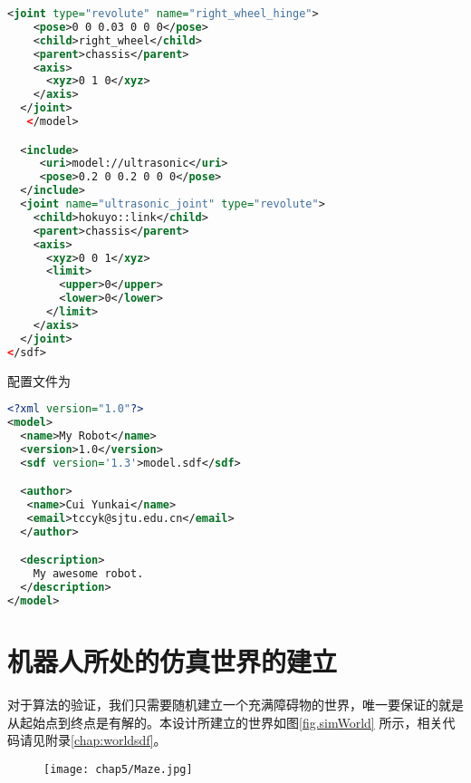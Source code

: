\begin{lstlisting}[language={XML}, caption={机器人模型描述文件}]
  <joint type="revolute" name="right_wheel_hinge">
    <pose>0 0 0.03 0 0 0</pose>
    <child>right_wheel</child>
    <parent>chassis</parent>
    <axis>
      <xyz>0 1 0</xyz>
    </axis>
  </joint>
   </model>

  <include>
     <uri>model://ultrasonic</uri>
     <pose>0.2 0 0.2 0 0 0</pose>
  </include>
  <joint name="ultrasonic_joint" type="revolute">
    <child>hokuyo::link</child>
    <parent>chassis</parent>
    <axis>
      <xyz>0 0 1</xyz>
      <limit>
        <upper>0</upper>
        <lower>0</lower>
      </limit>
    </axis>
  </joint>  
</sdf>
\end{lstlisting}
配置文件为 \\
\begin{lstlisting}[language={XML}, caption={机器人模型配置文件}]
<?xml version="1.0"?>
<model>
  <name>My Robot</name>
  <version>1.0</version>
  <sdf version='1.3'>model.sdf</sdf>

  <author>
   <name>Cui Yunkai</name>
   <email>tccyk@sjtu.edu.cn</email>
  </author>

  <description>
    My awesome robot.
  </description>
</model>
\end{lstlisting}
\section{机器人所处的仿真世界的建立}
对于算法的验证，我们只需要随机建立一个充满障碍物的世界，唯一要保证的就是从起始点到终点是有解的。本设计所建立的世界如图\ref{fig.simWorld} 所示，相关代码请见附录\ref{chap:worldsdf}。
\begin{figure}[!htp]
  \centering
  \texttt{[image: chap5/Maze.jpg]}
\end{figure}
